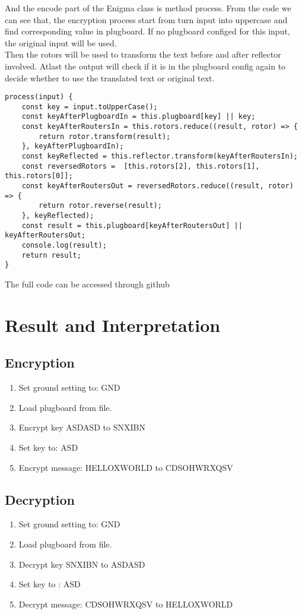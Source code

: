 \documentclass[11pt,a4paper]{article}
\begin{document}
And the encode part of the Enigma class is method process. From the code we can see that, the encryption process start from turn input into uppercase and find corresponding value in plugboard. If no plugboard configed for this input, the original input will be used.\\
Then the rotors will be used to transform the text before and after reflector involved.
Atlast the output will check if it is in the plugboard config again to decide whether to use the translated text or original text.
\begin{lstlisting}
process(input) {
    const key = input.toUpperCase();
    const keyAfterPlugboardIn = this.plugboard[key] || key;
    const keyAfterRoutersIn = this.rotors.reduce((result, rotor) => {
        return rotor.transform(result);
    }, keyAfterPlugboardIn);
    const keyReflected = this.reflector.transform(keyAfterRoutersIn);
    const reversedRotors =  [this.rotors[2], this.rotors[1], this.rotors[0]];
    const keyAfterRoutersOut = reversedRotors.reduce((result, rotor) => {
        return rotor.reverse(result);
    }, keyReflected);
    const result = this.plugboard[keyAfterRoutersOut] || keyAfterRoutersOut;
    console.log(result);
    return result;
}
\end{lstlisting}

The full code can be accessed through github\cite{midpaper:code}
\section{Result and Interpretation}
\subsection{Encryption}
\begin{enumerate}
\item Set ground setting to: GND
\item Load plugboard from file.
\item Encrypt key ASDASD to SNXIBN
\item Set key to: ASD
\item Encrypt message: HELLOXWORLD to CDSOHWRXQSV
\end{enumerate}

\subsection{Decryption}
\begin{enumerate}
\item Set ground setting to: GND
\item Load plugboard from file.
\item Decrypt key SNXIBN to ASDASD
\item Set key to : ASD
\item Decrypt message: CDSOHWRXQSV to HELLOXWORLD
\end{enumerate}
\end{document}

